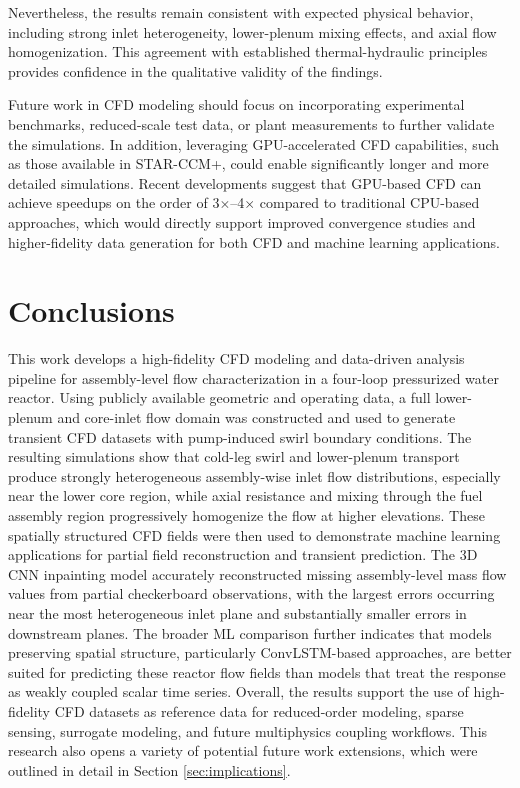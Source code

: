 \documentclass[review]{elsarticle}
\theoremstyle{definition}
\theoremstyle{definition}
\theoremstyle{remark}
\begin{document}
Nevertheless, the results remain consistent with expected physical behavior, including strong inlet heterogeneity, lower-plenum mixing effects, and axial flow homogenization. This agreement with established thermal-hydraulic principles provides confidence in the qualitative validity of the findings.

Future work in CFD modeling should focus on incorporating experimental benchmarks, reduced-scale test data, or plant measurements to further validate the simulations. In addition, leveraging GPU-accelerated CFD capabilities, such as those available in STAR-CCM+, could enable significantly longer and more detailed simulations. Recent developments suggest that GPU-based CFD can achieve speedups on the order of 3$\times$–4$\times$ compared to traditional CPU-based approaches, which would directly support improved convergence studies and higher-fidelity data generation for both CFD and machine learning applications.

\section{Conclusions}
\label{sec:conc}

This work develops a high-fidelity CFD modeling and data-driven analysis pipeline for assembly-level flow characterization in a four-loop pressurized water reactor. Using publicly available geometric and operating data, a full lower-plenum and core-inlet flow domain was constructed and used to generate transient CFD datasets with pump-induced swirl boundary conditions. The resulting simulations show that cold-leg swirl and lower-plenum transport produce strongly heterogeneous assembly-wise inlet flow distributions, especially near the lower core region, while axial resistance and mixing through the fuel assembly region progressively homogenize the flow at higher elevations. These spatially structured CFD fields were then used to demonstrate machine learning applications for partial field reconstruction and transient prediction. The 3D CNN inpainting model accurately reconstructed missing assembly-level mass flow values from partial checkerboard observations, with the largest errors occurring near the most heterogeneous inlet plane and substantially smaller errors in downstream planes. The broader ML comparison further indicates that models preserving spatial structure, particularly ConvLSTM-based approaches, are better suited for predicting these reactor flow fields than models that treat the response as weakly coupled scalar time series. Overall, the results support the use of high-fidelity CFD datasets as reference data for reduced-order modeling, sparse sensing, surrogate modeling, and future multiphysics coupling workflows. This research also opens a variety of potential future work extensions, which were outlined in detail in Section \ref{sec:implications}.
\end{document}
